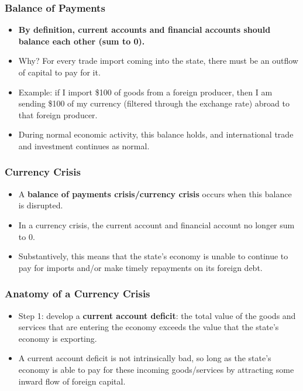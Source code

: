 \documentclass[handout]{beamer}
\begin{document}
\begin{frame} 
	\frametitle{\LARGE{Balance of Payments}}
	\begin{itemize}
		\item \textbf{By definition, current accounts and financial accounts should balance each other (sum to 0).} \pause
		\item Why? For every trade import coming into the state, there must be an outflow of capital to pay for it. \pause
		\item Example: if I import \$100 of goods from a foreign producer, then I am sending \$100 of my currency (filtered through the exchange rate) abroad to that foreign producer. \pause
		\item During normal economic activity, this balance holds, and international trade and investment continues as normal. 
	\end{itemize}
\end{frame}

\begin{frame} 
	\frametitle{\LARGE{Currency Crisis}}
	\begin{itemize}
		\item A \textbf{balance of payments crisis/currency crisis} occurs when this balance is disrupted. \pause
		\item In a currency crisis, the current account and financial account no longer sum to 0. \pause
		\item Substantively, this means that the state's economy is unable to continue to pay for imports and/or make timely repayments on its foreign debt. 
	\end{itemize}
\end{frame}

\begin{frame} 
	\frametitle{\LARGE{Anatomy of a Currency Crisis}}
	\begin{itemize}
		\item Step 1: develop a \textbf{current account deficit}: the total value of the goods and services that are entering the economy exceeds the value that the state's economy is exporting. \pause
		\item A current account deficit is not intrinsically bad, so long as the state's economy is able to pay for these incoming goods/services by attracting some inward flow of foreign capital.
	\end{itemize}
\end{frame}
\end{document}
